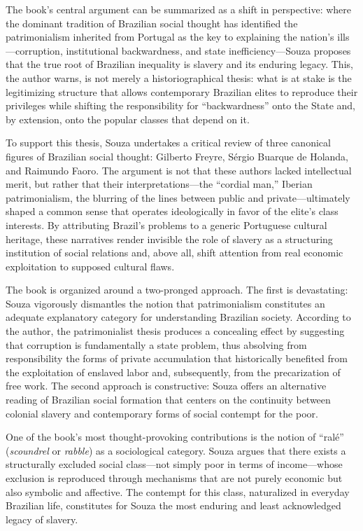 The book’s central argument can be summarized as a shift in perspective: where the dominant tradition of Brazilian social thought has identified the patrimonialism inherited from Portugal as the key to explaining the nation’s ills—corruption, institutional backwardness, and state inefficiency—Souza proposes that the true root of Brazilian inequality is slavery and its enduring legacy. This, the author warns, is not merely a historiographical thesis: what is at stake is the legitimizing structure that allows contemporary Brazilian elites to reproduce their privileges while shifting the responsibility for “backwardness” onto the State and, by extension, onto the popular classes that depend on it.

To support this thesis, Souza undertakes a critical review of three canonical figures of Brazilian social thought: Gilberto Freyre, Sérgio Buarque de Holanda, and Raimundo Faoro. The argument is not that these authors lacked intellectual merit, but rather that their interpretations—the “cordial man,” Iberian patrimonialism, the blurring of the lines between public and private—ultimately shaped a common sense that operates ideologically in favor of the elite’s class interests. By attributing Brazil’s problems to a generic Portuguese cultural heritage, these narratives render invisible the role of slavery as a structuring institution of social relations and, above all, shift attention from real economic exploitation to supposed cultural flaws.

The book is organized around a two-pronged approach. The first is devastating: Souza vigorously dismantles the notion that patrimonialism constitutes an adequate explanatory category for understanding Brazilian society. According to the author, the patrimonialist thesis produces a concealing effect by suggesting that corruption is fundamentally a state problem, thus absolving from responsibility the forms of private accumulation that historically benefited from the exploitation of enslaved labor and, subsequently, from the precarization of free work. The second approach is constructive: Souza offers an alternative reading of Brazilian social formation that centers on the continuity between colonial slavery and contemporary forms of social contempt for the poor.

One of the book’s most thought-provoking contributions is the notion of “ralé” (\textit{scoundrel} or \textit{rabble}) as a sociological category. Souza argues that there exists a structurally excluded social class—not simply poor in terms of income—whose exclusion is reproduced through mechanisms that are not purely economic but also symbolic and affective. The contempt for this class, naturalized in everyday Brazilian life, constitutes for Souza the most enduring and least acknowledged legacy of slavery.

